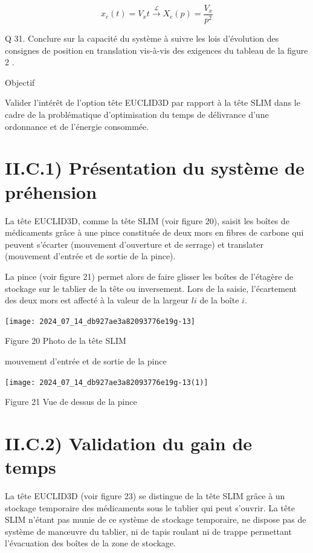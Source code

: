 \documentclass[10pt]{article}
\begin{document}
$$
x_{c}(t)=V_{x} t \stackrel{\mathcal{L}}{\rightarrow} X_{c}(p)=\frac{V_{x}}{p^{2}}
$$

Q 31. Conclure sur la capacité du système à suivre les lois d'évolution des consignes de position en translation vis-à-vis des exigences du tableau de la figure 2 .

Objectif

Valider l'intérêt de l'option tête EUCLID3D par rapport à la tête SLIM dans le cadre de la problématique d'optimisation du temps de délivrance d'une ordonnance et de l'énergie consommée.

\section*{II.C.1) Présentation du système de préhension}
La tête EUCLID3D, comme la tête SLIM (voir figure 20), saisit les boîtes de médicaments grâce à une pince constituée de deux mors en fibres de carbone qui peuvent s'écarter (mouvement d'ouverture et de serrage) et translater (mouvement d'entrée et de sortie de la pince).

La pince (voir figure 21) permet alors de faire glisser les boîtes de l'étagère de stockage sur le tablier de la tête ou inversement. Lors de la saisie, l'écartement des deux mors est affecté à la valeur de la largeur $l i$ de la boîte $i$.

\begin{center}
\texttt{[image: 2024\_07\_14\_db927ae3a82093776e19g-13]}
\end{center}

Figure 20 Photo de la tête SLIM

mouvement d'entrée et de sortie de la pince

\begin{center}
\texttt{[image: 2024\_07\_14\_db927ae3a82093776e19g-13(1)]}
\end{center}

Figure 21 Vue de dessus de la pince

\section*{II.C.2) Validation du gain de temps}
La tête EUCLID3D (voir figure 23) se distingue de la tête SLIM grâce à un stockage temporaire des médicaments sous le tablier qui peut s'ouvrir. La tête SLIM n'étant pas munie de ce système de stockage temporaire, ne dispose pas de système de manœuvre du tablier, ni de tapis roulant ni de trappe permettant l'évacuation des boîtes de la zone de stockage.
\end{document}
